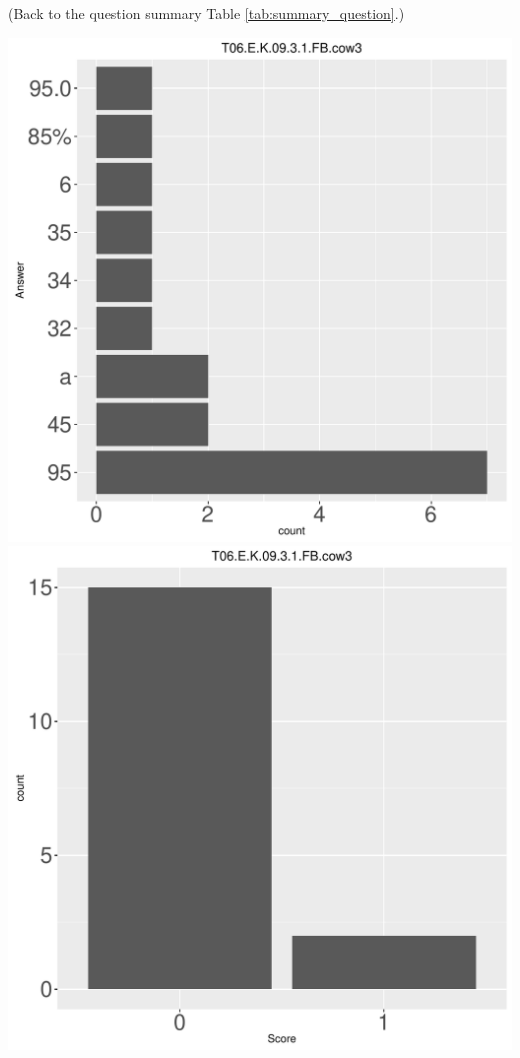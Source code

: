 \documentclass[12pt,english,nohyper]{tufte-handout}\usepackage[]{graphicx}\usepackage[]{color}
\begin{document}
 (Back to the question summary Table \ref{tab:summary_question}.)

\begin{center} \includegraphics[width=.45\linewidth]{Topic06_AB_32_answer} \includegraphics[width=.45\linewidth]{Topic06_AB_32_score} \end{center} 
\end{document}
